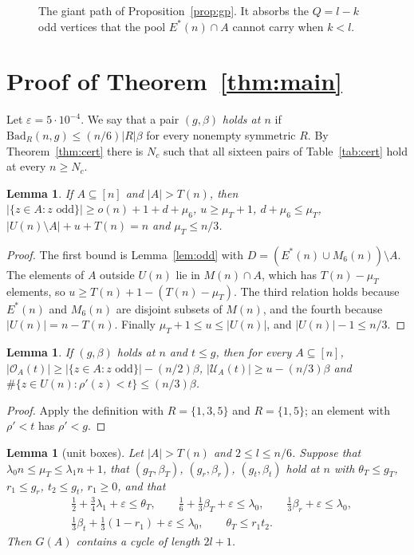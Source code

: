 \documentclass[11pt,a4paper]{article}
\newtheorem{lemma}[theorem]{Lemma}
\theoremstyle{definition}
\theoremstyle{remark}
\newcommand{\Es}{E^{*}}
\newcommand{\eps}{\varepsilon}
\newcommand{\OA}{\mathcal{O}_A}
\newcommand{\UA}{\mathcal{U}_A}
\begin{document}
\begin{figure}[t]
\centering

\caption{The giant path of Proposition~\ref{prop:gp}. It absorbs the $Q=l-k$ odd vertices that the
pool $\Es(n)\cap A$ cannot carry when $k<l$.}
\label{fig:giant}
\end{figure}

\section{\texorpdfstring{Proof of Theorem~\ref{thm:main}}{Proof of Theorem 1.1}}\label{sec:boxes}

Let $\eps=5\cdot10^{-4}$. We say that a pair $(g,\beta)$ \emph{holds at $n$} if
$\mathrm{Bad}_R(n,g)\le(n/6)|R|\beta$ for every nonempty symmetric $R$. By Theorem~\ref{thm:cert}
there is $N_c$ such that all sixteen pairs of Table~\ref{tab:cert} hold at every $n\ge N_c$.

\begin{lemma}\label{lem:basic}
If $A\subseteq[n]$ and $|A|>T(n)$, then $|\{z\in A:z\text{ odd}\}|\ge o(n)+1+d+\mu_6$, $u\ge\mu_T+1$,
$d+\mu_6\le\mu_T$, $|U(n)\setminus A|+u+T(n)=n$ and $\mu_T\le n/3$.
\end{lemma}

\begin{proof}
The first bound is Lemma~\ref{lem:odd} with $D=(\Es(n)\cup M_6(n))\setminus A$. The elements of $A$
outside $U(n)$ lie in $M(n)\cap A$, which has $T(n)-\mu_T$ elements, so $u\ge T(n)+1-(T(n)-\mu_T)$.
The third relation holds because $\Es(n)$ and $M_6(n)$ are disjoint subsets of $M(n)$, and the fourth
because $|U(n)|=n-T(n)$. Finally $\mu_T+1\le u\le|U(n)|$, and $|U(n)|-1\le n/3$.
\end{proof}

\begin{lemma}\label{lem:certcount}
If $(g,\beta)$ holds at $n$ and $t\le g$, then for every $A\subseteq[n]$,
$|\OA(t)|\ge|\{z\in A:z\text{ odd}\}|-(n/2)\beta$, $|\UA(t)|\ge u-(n/3)\beta$ and
$\#\{z\in U(n):\rho'(z)<t\}\le(n/3)\beta$.
\end{lemma}

\begin{proof}
Apply the definition with $R=\{1,3,5\}$ and $R=\{1,5\}$; an element with $\rho'<t$ has $\rho'<g$.
\end{proof}

\begin{lemma}[unit boxes]\label{lem:tbox}
Let $|A|>T(n)$ and $2\le l\le n/6$. Suppose that $\lambda_0n\le\mu_T\le\lambda_1n+1$, that
$(g_T,\beta_T)$, $(g_r,\beta_r)$, $(g_t,\beta_t)$ hold at $n$ with $\theta_T\le g_T$, $r_1\le g_r$,
$t_2\le g_t$, $r_1\ge0$, and that
\[
\begin{aligned}
  &\tfrac12+\tfrac34\lambda_1+\eps\le\theta_T,\qquad
  \tfrac16+\tfrac13\beta_T+\eps\le\lambda_0,\qquad
  \tfrac13\beta_r+\eps\le\lambda_0,\\
  &\tfrac13\beta_t+\tfrac13(1-r_1)+\eps\le\lambda_0,\qquad
  \theta_T\le r_1t_2 .
\end{aligned}
\]
Then $G(A)$ contains a cycle of length $2l+1$.
\end{lemma}
\end{document}
